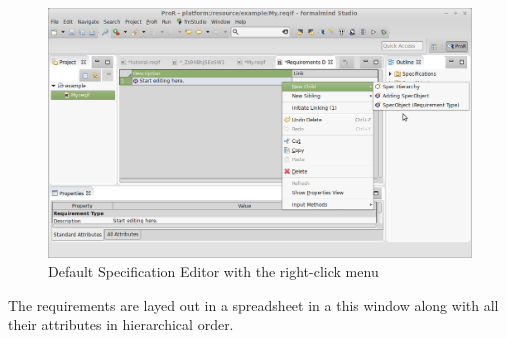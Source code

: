 \begin{figure}[H]
  \centering
  \includegraphics[width=\linewidth]{../rmf-images/default_spec_view.png}
  \caption{Default Specification Editor with the right-click menu}
  \label{fig:default specification editor}
\end{figure}
The requirements are layed out in a spreadsheet in a this window along with all their attributes in hierarchical order.

